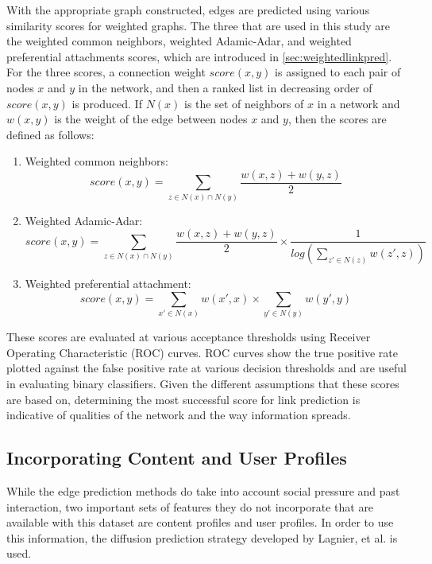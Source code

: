 With the appropriate graph constructed, edges are predicted using various similarity scores for weighted graphs.  The three that are used in this study are the weighted common neighbors, weighted Adamic-Adar, and weighted preferential attachments scores, which are introduced in \ref{sec:weightedlinkpred}.  For the three scores, a connection weight $score(x,y)$ is assigned to each pair of nodes $x$ and $y$ in the network, and then a ranked list in decreasing order of $score(x,y)$ is produced.  If $N(x)$ is the set of neighbors of $x$ in a network and $w(x,y)$ is the weight of the edge between nodes $x$ and $y$, then the scores are defined as follows: 
\begin{enumerate}
	\item Weighted common neighbors: $$score(x,y) = \sum_{z \in N(x) \cap N(y)}  \frac{w(x,z) + w(y,z)}{2}$$
	\item Weighted Adamic-Adar: $$score(x,y) = \sum_{z \in N(x) \cap N(y)} \frac{w(x,z) + w(y,z)}{2} \times \frac{1}{log(\sum_{z' \in N(z)} w(z',z))}$$
	\item Weighted preferential attachment: $$score(x,y) = \sum_{x' \in N(x)} w(x',x) \times \sum_{y' \in N(y)} w(y', y)$$
\end{enumerate}

These scores are evaluated at various acceptance thresholds using Receiver Operating Characteristic (ROC) curves.  ROC curves show the true positive rate plotted against the false positive rate at various decision thresholds and are useful in evaluating binary classifiers.  Given the different assumptions that these scores are based on, determining the most successful score for link prediction is indicative of qualities of the network and the way information spreads.

\subsection{Incorporating Content and User Profiles}
While the edge prediction methods do take into account social pressure and past interaction, two important sets of features they do not incorporate that are available with this dataset are content profiles and user profiles.  In order to use this information, the diffusion prediction strategy developed by Lagnier, et al. is used.

